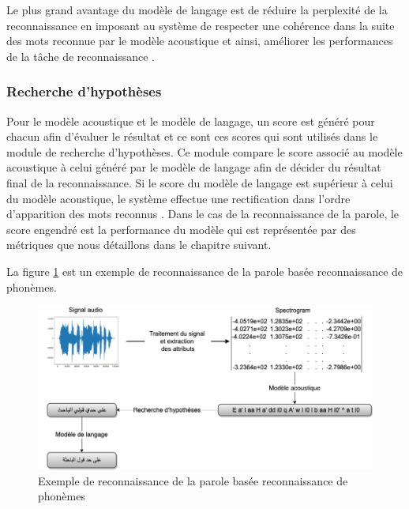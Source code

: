 Le plus grand avantage du modèle de langage est de réduire la perplexité de la reconnaissance en imposant au système de respecter une cohérence dans la suite des mots reconnue par le modèle acoustique et ainsi,  améliorer les performances de la tâche de reconnaissance \cite{langmodelbenefit}.


\subsubsection{Recherche d'hypothèses}
Pour le modèle acoustique et le modèle de langage, un score est généré pour chacun afin d'évaluer le résultat et ce sont ces scores qui sont utilisés dans le module de recherche d'hypothèses.
Ce module compare le score associé au modèle acoustique à celui généré par le modèle de langage afin de décider du résultat final de la reconnaissance. Si le score du modèle de langage est supérieur à celui du modèle acoustique, le système effectue une rectification dans l'ordre d'apparition des mots reconnus  \cite{deeplearningapproach}.
Dans le cas de la reconnaissance de la parole, le score engendré est la performance du modèle qui est représentée par des métriques que nous détaillons dans le chapitre suivant.

La figure \ref{explASRpho} est un exemple de reconnaissance de la parole basée reconnaissance de phonèmes.

\begin{figure}[H]
    \centering
    \includegraphics[width=400pt]{images/chap1/Exemple_ASR_Phoneme.png}
    \caption{Exemple de reconnaissance de la parole basée reconnaissance de phonèmes}
    \label{explASRpho}
\end{figure}


